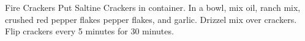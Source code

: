 \documentclass[../cookbook.tex]{subfiles}
\begin{document}
\begin{recipe}{Fire Crackers}{}{}
    Put Saltine Crackers in container.
    In a bowl, mix oil, ranch mix, crushed red pepper flakes
    pepper flakes, and garlic. Drizzel mix over crackers. Flip
    crackers every 5 minutes for 30 minutes.
    
\end{recipe}
\end{document}
